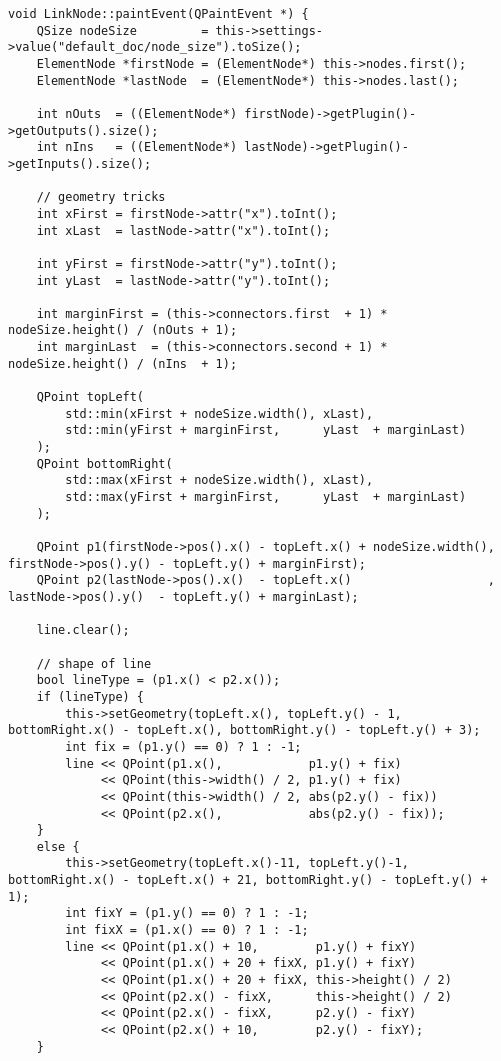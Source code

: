 \begin{lstlisting}
void LinkNode::paintEvent(QPaintEvent *) {
    QSize nodeSize         = this->settings->value("default_doc/node_size").toSize();
    ElementNode *firstNode = (ElementNode*) this->nodes.first();
    ElementNode *lastNode  = (ElementNode*) this->nodes.last();

    int nOuts  = ((ElementNode*) firstNode)->getPlugin()->getOutputs().size();
    int nIns   = ((ElementNode*) lastNode)->getPlugin()->getInputs().size();

    // geometry tricks
    int xFirst = firstNode->attr("x").toInt();
    int xLast  = lastNode->attr("x").toInt();

    int yFirst = firstNode->attr("y").toInt();
    int yLast  = lastNode->attr("y").toInt();

    int marginFirst = (this->connectors.first  + 1) * nodeSize.height() / (nOuts + 1);
    int marginLast  = (this->connectors.second + 1) * nodeSize.height() / (nIns  + 1);

    QPoint topLeft(
        std::min(xFirst + nodeSize.width(), xLast),
        std::min(yFirst + marginFirst,      yLast  + marginLast)
    );
    QPoint bottomRight(
        std::max(xFirst + nodeSize.width(), xLast),
        std::max(yFirst + marginFirst,      yLast  + marginLast)
    );

    QPoint p1(firstNode->pos().x() - topLeft.x() + nodeSize.width(), firstNode->pos().y() - topLeft.y() + marginFirst);
    QPoint p2(lastNode->pos().x()  - topLeft.x()                   , lastNode->pos().y()  - topLeft.y() + marginLast);

    line.clear();

    // shape of line
    bool lineType = (p1.x() < p2.x());
    if (lineType) {
        this->setGeometry(topLeft.x(), topLeft.y() - 1, bottomRight.x() - topLeft.x(), bottomRight.y() - topLeft.y() + 3);
        int fix = (p1.y() == 0) ? 1 : -1;
        line << QPoint(p1.x(),            p1.y() + fix)
             << QPoint(this->width() / 2, p1.y() + fix)
             << QPoint(this->width() / 2, abs(p2.y() - fix))
             << QPoint(p2.x(),            abs(p2.y() - fix));
    }
    else {
        this->setGeometry(topLeft.x()-11, topLeft.y()-1, bottomRight.x() - topLeft.x() + 21, bottomRight.y() - topLeft.y() + 1);
        int fixY = (p1.y() == 0) ? 1 : -1;
        int fixX = (p1.x() == 0) ? 1 : -1;
        line << QPoint(p1.x() + 10,        p1.y() + fixY)
             << QPoint(p1.x() + 20 + fixX, p1.y() + fixY)
             << QPoint(p1.x() + 20 + fixX, this->height() / 2)
             << QPoint(p2.x() - fixX,      this->height() / 2)
             << QPoint(p2.x() - fixX,      p2.y() - fixY)
             << QPoint(p2.x() + 10,        p2.y() - fixY);
    }


\end{lstlisting}
